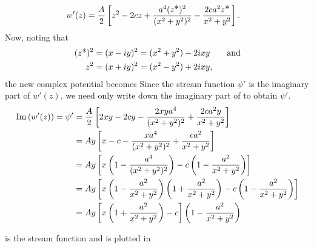 \documentclass[12pt]{book}
\renewcommand{\star}{{\scalebox{1.1}{*} }}
\begin{document}
{\begin{align*}
w'(z) &= \frac{A}{2}\left[  z^2 - 2cz + \frac{a^4(z\star)^2}{(x^2 + y^2)^2} - \frac{2ca^2z\star}{x^2 + y^2}\right].
\end{align*}
Now, noting that 
\begin{align}
(z\star)^2 &= (x-iy)^2 = (x^2 + y^2) - 2ixy \qquad  \mathrm{and}\\
  z^2 &= (x+iy)^2 = (x^2 - y^2) + 2ixy,
\end{align}
the new complex potential becomes
Since the stream function $\psi'$ is the imaginary part of $w'(z)$, we need only write down the imaginary part of  to obtain $\psi'$.
\begin{align}
\Im{w'(z)} = \psi' &= \frac{A}{2}\left[  2xy - 2cy - \frac{2xya^4}{(x^2 + y^2)^2} + \frac{2ca^2y}{x^2 + y^2}\right] \notag\\
&= Ay\left[  x - c - \frac{xa^4}{(x^2 + y^2)^2} + \frac{ca^2}{x^2 + y^2}\right] \notag\\
&= Ay\left[  x\left(  1 - \frac{a^4}{(x^2 + y^2)^2}\right) -c\left(1- \frac{a^2}{x^2 + y^2}\right)\right]\notag\\
&= Ay\left[  x\left(  1 - \frac{a^2}{x^2 + y^2}\right)\left(  1 + \frac{a^2}{x^2 + y^2}\right) -c\left(1- \frac{a^2}{x^2 + y^2}\right)\right]\notag\\
&= Ay\left[x\left(1 + \frac{a^2}{x^2 + y^2}\right)-c\right] \left(1 - \frac{a^2}{x^2 + y^2}\right) \label{4-1streamfunction}
\end{align}

 is the stream function and is plotted in 
}
\end{document}
